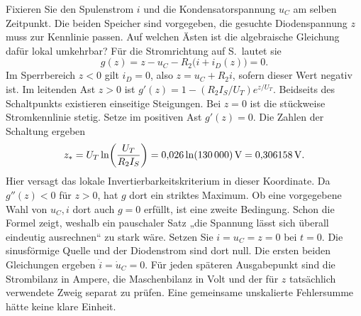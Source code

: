 Fixieren Sie den Spulenstrom \(i\) und die Kondensatorspannung \(u_C\) am selben Zeitpunkt. Die beiden Speicher sind vorgegeben, die gesuchte Diodenspannung \(z\) muss zur Kennlinie passen. Auf welchen Ästen ist die algebraische Gleichung dafür lokal umkehrbar? Für die Stromrichtung auf S.\, lautet sie
\[
 g(z)=z-u_C-R_2\bigl(i+i_D(z)\bigr)=0 .
\]
Im Sperrbereich \(z<0\) gilt \(i_D=0\), also \(z=u_C+R_2i\), sofern dieser Wert negativ ist. Im leitenden Ast \(z>0\) ist \(g'(z)=1-(R_2I_S/U_T)e^{z/U_T}\). Beidseits des Schaltpunkts existieren einseitige Steigungen. Bei \(z=0\) ist die stückweise Stromkennlinie stetig.
Setze im positiven Ast \(g'(z)=0\). Die Zahlen der Schaltung ergeben
\[
 z_* = U_T\ln\!\left(\frac{U_T}{R_2I_S}\right)
      =0{,}026\ln(130\,000)\,\mathrm{V}=0{,}306158\,\mathrm{V} .
\]
Hier versagt das lokale Invertierbarkeitskriterium in dieser Koordinate. Da \(g''(z)<0\) für \(z>0\), hat \(g\) dort ein striktes Maximum. Ob eine vorgegebene Wahl von \(u_C,i\) dort auch \(g=0\) erfüllt, ist eine zweite Bedingung. Schon die Formel zeigt, weshalb ein pauschaler Satz „die Spannung lässt sich überall eindeutig ausrechnen“ zu stark wäre.
Setzen Sie \(i=u_C=z=0\) bei \(t=0\). Die sinusförmige Quelle und der Diodenstrom sind dort null. Die ersten beiden Gleichungen ergeben \(\dot i=\dot u_C=0\). Für jeden späteren Ausgabepunkt sind die Strombilanz in Ampere, die Maschenbilanz in Volt und der für \(z\) tatsächlich verwendete Zweig separat zu prüfen. Eine gemeinsame unskalierte Fehlersumme hätte keine klare Einheit.

